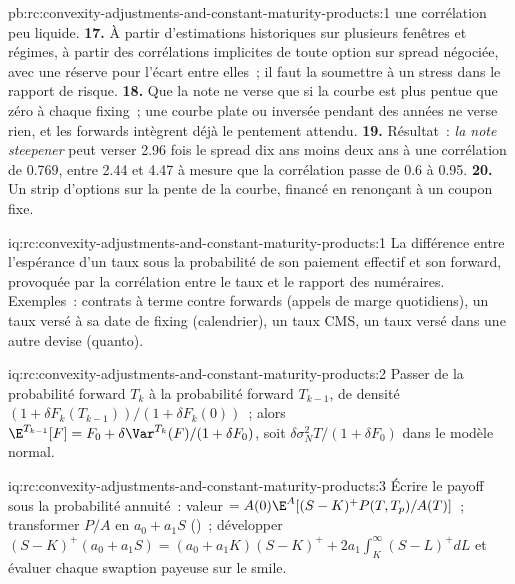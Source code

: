 \begin{solution}{pb:rc:convexity-adjustments-and-constant-maturity-products:1}
une corrélation peu liquide.
\textbf{17.} À partir d'estimations historiques sur plusieurs fenêtres et régimes, à partir des
corrélations implicites de toute option sur spread négociée, avec une réserve pour l'écart
entre elles~; il faut la soumettre à un stress dans le rapport de risque.
\textbf{18.} Que la note ne verse que si la courbe est plus pentue que zéro à chaque
fixing~; une courbe plate ou inversée pendant des années ne verse rien, et les forwards
intègrent déjà le pentement attendu.
\textbf{19.} Résultat~: \emph{la note steepener} peut verser 2.96 fois le spread dix ans
moins deux ans à une corrélation de 0.769, entre 2.44 et 4.47 à mesure que la
corrélation passe de 0.6 à 0.95.
\textbf{20.} Un strip d'options sur la pente de la courbe, financé en renonçant
à un coupon fixe.
\end{solution}

\begin{solution}{iq:rc:convexity-adjustments-and-constant-maturity-products:1}
La différence entre l'espérance d'un taux sous la probabilité de son paiement effectif
et son forward, provoquée par la corrélation entre le taux et le rapport
des numéraires. Exemples~: contrats à terme contre forwards (appels de marge quotidiens),
un taux versé à sa date de fixing (calendrier), un taux CMS, un taux versé dans une autre
devise (quanto).
\end{solution}

\begin{solution}{iq:rc:convexity-adjustments-and-constant-maturity-products:2}
Passer de la probabilité forward $T_k$ à la probabilité forward $T_{k-1}$, de densité
$(1+\delta F_k(T_{k-1}))/(1+\delta F_k(0))$~; alors $\E^{T_{k-1}}[F] =
F_0+\delta\Var^{T_k}(F)/(1+\delta F_0)$, soit $\delta\sigma_N^2T/(1+\delta F_0)$ dans le
modèle normal.
\end{solution}

\begin{solution}{iq:rc:convexity-adjustments-and-constant-maturity-products:3}
Écrire le payoff sous la probabilité annuité~: valeur $=A(0)\E^A[(S-K)^+P(T,T_p)/A(T)]$~;
transformer $P/A$ en $a_0+a_1S$ ()~; développer
$(S-K)^+(a_0+a_1S) = (a_0+a_1K)(S-K)^+ + 2a_1\int_K^\infty(S-L)^+dL$ et évaluer
chaque swaption payeuse sur le smile.
\end{solution}

